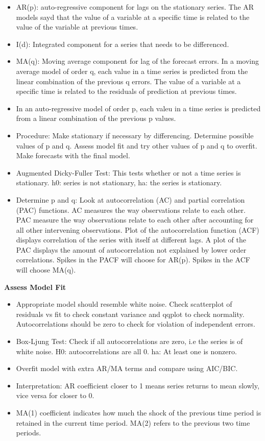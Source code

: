 \documentclass[]{book}
\begin{document}
\begin{itemize}
\item
  AR(p): auto-regressive component for lags on the stationary series.
  The AR models sayd that the value of a variable at a specific time is
  related to the value of the variable at previous times.
\item
  I(d): Integrated component for a series that needs to be differenced.
\item
  MA(q): Moving average component for lag of the forecast errors. In a
  moving average model of order q, each value in a time series is
  predicted from the linear combination of the previous q errors. The
  value of a variable at a specific time is related to the residuals of
  prediction at previous times.
\item
  In an auto-regressive model of order p, each valeu in a time series is
  predicted from a linear combination of the previous p values.
\item
  Procedure: Make stationary if necessary by differencing. Determine
  possible values of p and q. Assess model fit and try other values of p
  and q to overfit. Make forecasts with the final model.
\item
  Augmented Dicky-Fuller Test: This tests whether or not a time series
  is stationary. h0: series is not stationary, ha: the series is
  stationary.
\item
  Determine p and q: Look at autocorrelation (AC) and partial
  correlation (PAC) functions. AC measures the way observations relate
  to each other. PAC measure the way observations relate to each other
  after accounting for all other intervening observations. Plot of the
  autocorrelation function (ACF) displays correlation of the series with
  itself at different lags. A plot of the PAC displays the amount of
  autocorrelation not explained by lower order correlations. Spikes in
  the PACF will choose for AR(p). Spikes in the ACF will choose MA(q).
\end{itemize}

\textbf{Assess Model Fit}

\begin{itemize}
\item
  Appropriate model should resemble white noise. Check scatterplot of
  residuals vs fit to check constant variance and qqplot to check
  normality. Autocorrelations should be zero to check for violation of
  independent errors.
\item
  Box-Ljung Test: Check if all autocorrelations are zero, i.e the series
  is of white noise. H0: autocorrelations are all 0. ha: At least one is
  nonzero.
\item
  Overfit model with extra AR/MA terms and compare using AIC/BIC.
\item
  Interpretation: AR coefficient closer to 1 means series returns to
  mean slowly, vice versa for closer to 0.
\item
  MA(1) coefficient indicates how much the shock of the previous time
  period is retained in the current time period. MA(2) refers to the
  previous two time periods.
\end{itemize}
\end{document}
